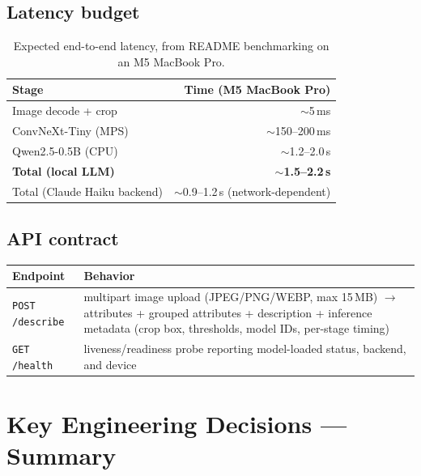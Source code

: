 \documentclass[11pt]{article}
\newcommand{\code}[1]{\texttt{\small #1}}
\begin{document}
\subsection{Latency budget}

\begin{table}[h]
\centering
\begin{tabular}{lr}
\toprule
\textbf{Stage} & \textbf{Time (M5 MacBook Pro)} \\
\midrule
Image decode + crop & $\sim$5\,ms \\
ConvNeXt-Tiny (MPS) & $\sim$150--200\,ms \\
Qwen2.5-0.5B (CPU) & $\sim$1.2--2.0\,s \\
\midrule
\textbf{Total (local LLM)} & \textbf{$\sim$1.5--2.2\,s} \\
Total (Claude Haiku backend) & $\sim$0.9--1.2\,s (network-dependent) \\
\bottomrule
\end{tabular}
\caption{Expected end-to-end latency, from README benchmarking on an M5 MacBook Pro.}
\end{table}

\subsection{API contract}

\begin{center}
\small
\begin{tabular}{p{3.6cm}p{10.5cm}}
\toprule
\textbf{Endpoint} & \textbf{Behavior} \\
\midrule
\code{POST /describe} & multipart image upload (JPEG/PNG/WEBP, max 15\,MB) $\to$ attributes + grouped attributes + description + inference metadata (crop box, thresholds, model IDs, per-stage timing) \\
\code{GET /health} & liveness/readiness probe reporting model-loaded status, backend, and device \\
\bottomrule
\end{tabular}
\end{center}

\section{Key Engineering Decisions --- Summary}
\end{document}
